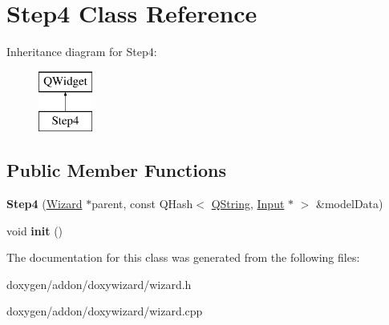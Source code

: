 \hypertarget{class_step4}{}\section{Step4 Class Reference}
\label{class_step4}
Inheritance diagram for Step4\+:\begin{figure}[H]
\begin{center}
\leavevmode
\includegraphics[height=2.000000cm]{class_step4}
\end{center}
\end{figure}
\subsection*{Public Member Functions}
\begin{DoxyCompactItemize}
\item 
\mbox{\label{class_step4_a3bd177cbe09ea00e06cb7005d280b595}} 
{\bfseries Step4} (\mbox{\hyperlink{class_wizard}{Wizard}} $\ast$parent, const Q\+Hash$<$ \mbox{\hyperlink{class_q_string}{Q\+String}}, \mbox{\hyperlink{class_input}{Input}} $\ast$ $>$ \&model\+Data)
\item 
\mbox{\label{class_step4_ad17bd327339d9accbce940ce99c0915a}} 
void {\bfseries init} ()
\end{DoxyCompactItemize}


The documentation for this class was generated from the following files\+:\begin{DoxyCompactItemize}
\item 
doxygen/addon/doxywizard/wizard.\+h\item 
doxygen/addon/doxywizard/wizard.\+cpp\end{DoxyCompactItemize}
